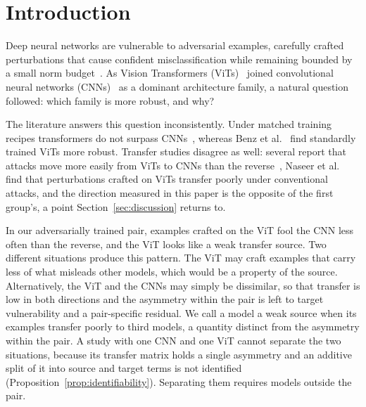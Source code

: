 \section{Introduction}
\label{sec:introduction}

Deep neural networks are vulnerable to adversarial examples, carefully crafted perturbations that cause confident misclassification while remaining bounded by a small norm budget~\cite{szegedy2014intriguing, goodfellow2015explaining}. As Vision Transformers (ViTs)~\cite{dosovitskiy2021image, vaswani2017attention} joined convolutional neural networks (CNNs)~\cite{he2016deep} as a dominant architecture family, a natural question followed: which family is more robust, and why?

The literature answers this question inconsistently. Under matched training recipes transformers do not surpass CNNs~\cite{bai2021transformers}, whereas Benz et al.~\cite{benz2021adversarial} find standardly trained ViTs more robust. Transfer studies disagree as well: several report that attacks move more easily from ViTs to CNNs than the reverse~\cite{mahmood2021robustness, benz2021adversarial, shao2022adversarial}, Naseer et al.~\cite{naseer2022improving} find that perturbations crafted on ViTs transfer poorly under conventional attacks, and the direction measured in this paper is the opposite of the first group's, a point Section~\ref{sec:discussion} returns to.

In our adversarially trained pair, examples crafted on the ViT fool the CNN less often than the reverse, and the ViT looks like a weak transfer source. Two different situations produce this pattern. The ViT may craft examples that carry less of what misleads other models, which would be a property of the source. Alternatively, the ViT and the CNNs may simply be dissimilar, so that transfer is low in both directions and the asymmetry within the pair is left to target vulnerability and a pair-specific residual. We call a model a weak source when its examples transfer poorly to third models, a quantity distinct from the asymmetry within the pair. A study with one CNN and one ViT cannot separate the two situations, because its transfer matrix holds a single asymmetry and an additive split of it into source and target terms is not identified (Proposition~\ref{prop:identifiability}). Separating them requires models outside the pair.

